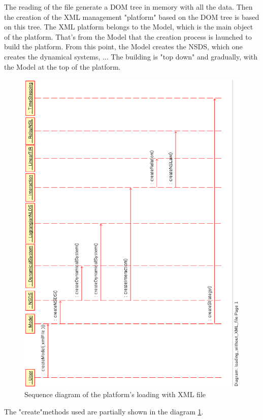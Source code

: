 The reading of the file generate a DOM tree in memory with all the data. Then the creation of the XML management "platform" based on
the DOM tree is based on this tree.
The XML platform belongs to the Model, which is the main object of the platform. That's from the
Model that the creation process is launched to build the platform.
From this point, the Model creates the NSDS, which one creates the dynamical systems, ... The
building is "top down" and gradually, with the Model at the top of the platform. 
\begin{figure}
\begin{center}
        \includegraphics[scale=0.75, clip]{figure/platform_loading_XML.ps}
        \caption{Sequence diagram of the platform's loading with XML file}
        \label{fig: platform's loading1}
\end{center}
\end{figure}
The "create"methods used are partially shown in the diagram \ref{fig: platform's loading1}.

